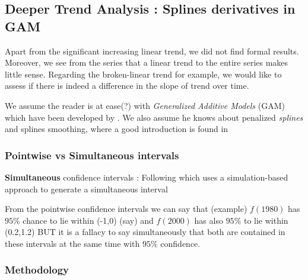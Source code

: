 \documentclass[11pt,a4paper,openany ]{book}
\begin{document}
\subsection{Deeper Trend Analysis : Splines derivatives in GAM}\label{sec:splines}

Apart from the significant increasing linear trend, we did not find formal results. Moreover, we see from the series that a linear trend to the entire series makes little sense. Regarding the broken-linear trend for example, we would like to assess if there is indeed a difference in the slope of trend over time. 

We assume the reader is at ease(?) with\emph{ Generalized Additive Models} (GAM) which have been developed by \citet{hastie_generalized_1986}. We also assume he knows about penalized \emph{splines} and splines smoothing, where a good introduction is found in \citet[section 3]{ruppert_semiparametric_2003}


\subsubsection*{Pointwise vs Simultaneous intervals}

\textbf{Simultaneous} confidence intervals :  Following \citet[section 3, section 4.9, section 6.5]{ruppert_semiparametric_2003} which uses a simulation-based approach to generate a simultaneous interval
\citet{marra_coverage_2012}

From the pointwise confidence intervals we can say that (example) $f(1980)$ has $95\%$ chance to lie within (-1,0) (say) and $f(2000)$ has also $95\%$ to lie within (0.2,1.2) BUT it is a fallacy to say simultaneously that both are contained in these intervals at the same time with $95\%$ confidence. \citet[section 6.5]{ruppert_semiparametric_2003}


\subsubsection*{Methodology}
\end{document}
